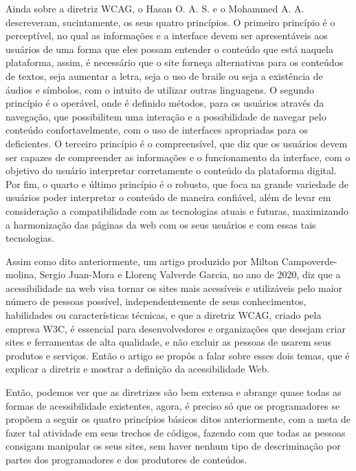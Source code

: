 \documentclass[a4paper]{article}
\begin{document}
\begin{titlepage}
Ainda sobre a diretriz WCAG, o Hasan O. A. S. e o Mohammed A. A. descreveram, sucintamente, os seus quatro princípios. O primeiro princípio é o perceptível, no qual as informações e a interface devem ser apresentáveis aos usuários de uma forma que eles possam entender o conteúdo que está naquela plataforma, assim, é necessário que o site forneça alternativas para os conteúdos de textos, seja aumentar a letra, seja o uso de braile ou seja a existência de áudios e símbolos, com o intuito de utilizar outras linguagens. O segundo princípio é o operável, onde é definido métodos, para os usuários através da navegação, que possibilitem uma interação e a possibilidade de navegar pelo conteúdo confortavelmente, com o uso de interfaces apropriadas para os deficientes. O terceiro princípio é o compreensível, que diz que os usuários devem ser capazes de compreender as informações e o funcionamento da interface, com o objetivo do usuário interpretar corretamente o conteúdo da plataforma digital. Por fim, o quarto e último princípio é o robusto, que foca na grande variedade de usuários poder interpretar o conteúdo de maneira confiável, além de levar em consideração a compatibilidade com as tecnologias atuais e futuras, maximizando a harmonização das páginas da web com os seus usuários e com essas tais tecnologias.

Assim como dito anteriormente, um artigo produzido por Milton Campoverde-molina, Sergio Juan-Mora e Llorenç Valverde Garcia, no ano de 2020, diz que a acessibilidade na web visa tornar os sites mais acessíveis e utilizáveis pelo maior número de pessoas possível, independentemente de seus conhecimentos, habilidades ou características técnicas, e que a diretriz WCAG, criado pela empresa W3C, é essencial para desenvolvedores e organizações que desejam criar sites e ferramentas de alta qualidade, e não excluir as pessoas de usarem seus produtos e serviços. Então o artigo se propôs a falar sobre esses dois temas, que é explicar a diretriz e mostrar a definição da acessibilidade Web.

Então, podemos ver que as diretrizes são bem extensa e abrange quase todas as formas de acessibilidade existentes, agora, é preciso só que os programadores se propõem a seguir os quatro princípios básicos ditos anteriormente, com a meta de fazer tal atividade em seus trechos de códigos, fazendo com que todas as pessoas consigam manipular os seus sites, sem haver nenhum tipo de descriminação por partes dos programadores e dos produtores de conteúdos.


\end{titlepage}
\end{document}
